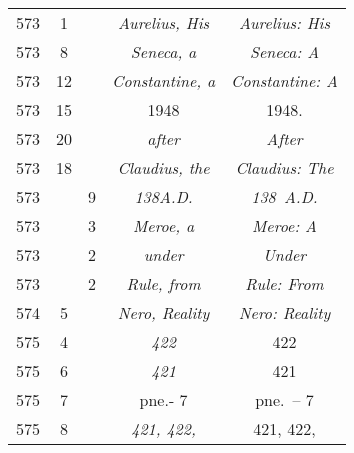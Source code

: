 \documentclass[a4paper,11pt]{article}
\begin{document}
\begin{center}
\begin{tabular}{|c|c|c|c|c|}
    573 &  1 & & \textit{Aurelius, His} & \textit{Aurelius: His} \\
    573 &  8 & & \textit{Seneca, a} & \textit{Seneca: A} \\
    573 & 12 & & \textit{Constantine, a} & \textit{Constantine: A} \\
    573 & 15 & & 1948 & 1948. \\
    573 & 20 & & \textit{after} & \textit{After} \\
    573 & 18 & & \textit{Claudius, the} & \textit{Claudius: The} \\
    573 & &  9 & \textit{138A.D.} & \textit{138~A.D.} \\
    573 & &  3 & \textit{Meroe, a} & \textit{Meroe: A} \\
    573 & &  2 & \textit{under} & \textit{Under} \\
    573 & &  2 & \textit{Rule, from} & \textit{Rule: From} \\
    574 &  5 & & \textit{Nero, Reality} & \textit{Nero: Reality} \\
    575 &  4 & & \textit{422} & 422 \\
    575 &  6 & & \textit{421} & 421 \\
    575 &  7 & & pne.- 7 & pne.~-- 7 \\
    575 &  8 & & \textit{421, 422,} & 421, 422, \\
    \hline
  \end{tabular}





  \newpage


\end{center}
\end{document}
